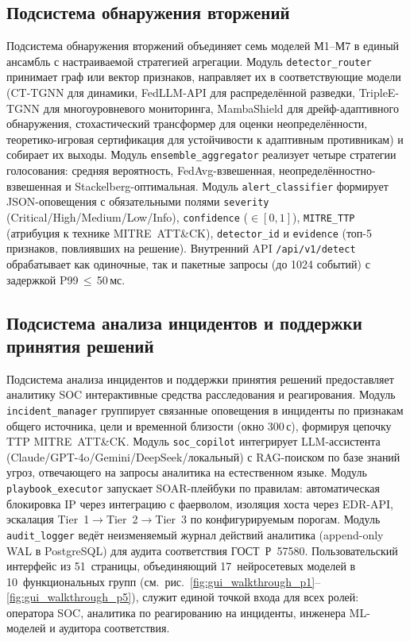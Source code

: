 \subsection{Подсистема обнаружения вторжений}
\label{subsec:func_detection}

Подсистема обнаружения вторжений объединяет семь моделей М1--М7 в единый ансамбль с настраиваемой стратегией агрегации. Модуль \texttt{detector\_router} принимает граф или вектор признаков, направляет их в соответствующие модели (CT-TGNN для динамики, FedLLM-API для распределённой разведки, TripleE-TGNN для многоуровневого мониторинга, MambaShield для дрейф-адаптивного обнаружения, стохастический трансформер для оценки неопределённости, теоретико-игровая сертификация для устойчивости к адаптивным противникам) и собирает их выходы. Модуль \texttt{ensemble\_aggregator} реализует четыре стратегии голосования: средняя вероятность, FedAvg-взвешенная, неопределённостно-взвешенная и Stackelberg-оптимальная. Модуль \texttt{alert\_classifier} формирует JSON-оповещения с обязательными полями \texttt{severity} (Critical/High/Medium/Low/Info), \texttt{confidence} ($\in[0,1]$), \texttt{MITRE\_TTP} (атрибуция к технике MITRE~ATT\&CK), \texttt{detector\_id} и \texttt{evidence} (топ-5 признаков, повлиявших на решение). Внутренний API \texttt{/api/v1/detect} обрабатывает как одиночные, так и пакетные запросы (до 1024 событий) с задержкой P99\,$\leq$\,50\,мс.

\subsection{Подсистема анализа инцидентов и поддержки принятия решений}
\label{subsec:func_incident}

Подсистема анализа инцидентов и поддержки принятия решений предоставляет аналитику SOC интерактивные средства расследования и реагирования. Модуль \texttt{incident\_manager} группирует связанные оповещения в инциденты по признакам общего источника, цели и временной близости (окно 300\,с), формируя цепочку TTP MITRE~ATT\&CK. Модуль \texttt{soc\_copilot} интегрирует LLM-ассистента (Claude/GPT-4o/Gemini/DeepSeek/локальный) с RAG-поиском по базе знаний угроз, отвечающего на запросы аналитика на естественном языке. Модуль \texttt{playbook\_executor} запускает SOAR-плейбуки по правилам: автоматическая блокировка IP через интеграцию с фаерволом, изоляция хоста через EDR-API, эскалация Tier~1$\to$Tier~2$\to$Tier~3 по конфигурируемым порогам. Модуль \texttt{audit\_logger} ведёт неизменяемый журнал действий аналитика (append-only WAL в PostgreSQL) для аудита соответствия ГОСТ~Р~57580. Пользовательский интерфейс из 51~страницы, объединяющий 17~нейросетевых моделей в 10~функциональных групп (см.~рис.~\ref{fig:gui_walkthrough_p1}--\ref{fig:gui_walkthrough_p5}), служит единой точкой входа для всех ролей: оператора SOC, аналитика по реагированию на инциденты, инженера ML-моделей и аудитора соответствия.

